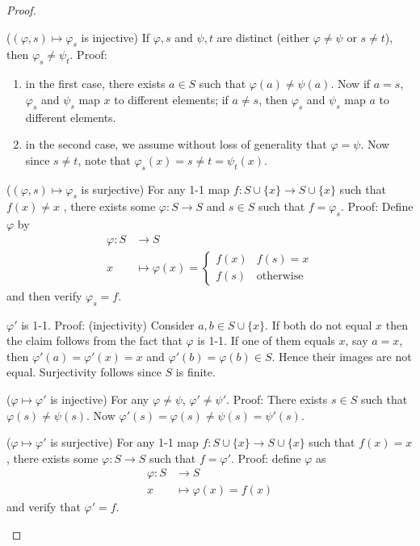 \begin{enumerate}[resume]
\begin{proof}
\begin{claim}($( \varphi, s ) \mapsto \varphi_s$ is injective)
	If $\varphi, s$ and $\psi, t$ are distinct (either $\varphi \neq  \psi$ or $s \neq t$), then $\varphi_s \neq  \psi_t$. Proof: 
	\begin{enumerate}
		\item in the first case, there exists $a \in S$ such that $\varphi(a) \neq \psi(a)$. Now if $a = s$, $\varphi_s$ and $\psi_s$ map $x$ to different elements; if $a\neq s$, then $\varphi_s$ and $\psi_s$ map $a$ to different elements.
		\item in the second case, we assume without loss of generality that $\varphi = \psi$. Now since $s \neq t$, note that $\varphi_s(x) = s \neq t = \psi_t(x)$.
	\end{enumerate}
\end{claim}
\begin{claim}($(\varphi, s) \mapsto \varphi_s$ is surjective)
	For any 1-1 map $f:S \cup \{x\} \to S \cup \{x\} $ such that $f(x)\neq x$ , there exists some $\varphi: S\to S$ and $s \in S$ such that $f = \varphi_s$. Proof: Define $\varphi$ by \begin{align*}
		\varphi: S &\longrightarrow S \\
		x &\longmapsto \varphi(x) = \begin{cases}
			f(x) & f(s) = x \\
			f(s) & \text{otherwise}
		\end{cases}
	\end{align*}
	and then verify $\varphi_s = f$.
\end{claim}

\begin{claim}
	$\varphi'$ is 1-1. Proof: (injectivity) Consider $a,b \in S \cup \{x\} $. If both do not equal $x$ then the claim follows from the fact that $\varphi$ is 1-1. If one of them equals $x$, say $a=x$, then $\varphi'(a) = \varphi'(x) = x$ and $\varphi'(b) = \varphi(b) \in S$. Hence their images are not equal. Surjectivity follows since $S$ is finite.
\end{claim}

\begin{claim}($\varphi \mapsto \varphi'$ is injective)
	For any $\varphi \neq  \psi$, $\varphi' \neq  \psi'$. Proof: There exists $s \in S$ such that  $\varphi(s) \neq  \psi(s)$. Now $\varphi'(s) = \varphi(s) \neq  \psi(s) = \psi'(s)$.
\end{claim}

\begin{claim}($\varphi \mapsto \varphi'$ is surjective)
	For any 1-1 map $f:S \cup \{x\} \to S \cup \{x\} $ such that $f(x)= x$ , there exists some $\varphi:S\to S$ such that $f = \varphi'$. Proof: define $\varphi$ as \begin{align*}
		\varphi: S &\longrightarrow S \\
		x &\longmapsto \varphi(x) = f(x)
	\end{align*}
	and verify that $\varphi' = f$.
\end{claim}



\end{proof}
\end{enumerate}

